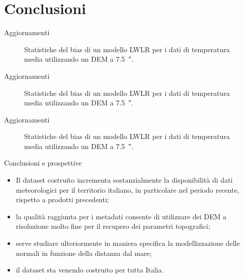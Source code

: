 
\section{Conclusioni}
\begin{frame}{Aggiornamenti}

  \begin{figure}
    
    \caption*{Statistiche del bias di un modello LWLR per i dati di temperatura media utilizzando un DEM a \qty{7.5}{\arcsecond}.}
  \end{figure}
\end{frame}

\begin{frame}{Aggiornamenti}
  \begin{figure}
    
    \caption*{Statistiche del bias di un modello LWLR per i dati di temperatura media utilizzando un DEM a \qty{7.5}{\arcsecond}.}
  \end{figure}
\end{frame}

\begin{frame}{Aggiornamenti}
  \begin{figure}
    
    \caption*{Statistiche del bias di un modello LWLR per i dati di temperatura media utilizzando un DEM a \qty{7.5}{\arcsecond}.}
  \end{figure}
\end{frame}

\begin{frame}{Conclusioni e prospettive}
  \begin{itemize}
    \item Il dataset costruito incrementa sostanzialmente la disponibilità di dati meteorologici per il territorio italiano, in particolare nel periodo recente, rispetto a prodotti precedenti;
    \item la qualità raggiunta per i metadati consente di utilizzare dei DEM a risoluzione molto fine per il recupero dei parametri topografici;
    \item serve studiare ulteriormente in maniera specifica la modellizzazione delle normali in funzione della distanza dal mare;
    \item il dataset sta venendo costruito per tutta Italia.
  \end{itemize}
\end{frame}
